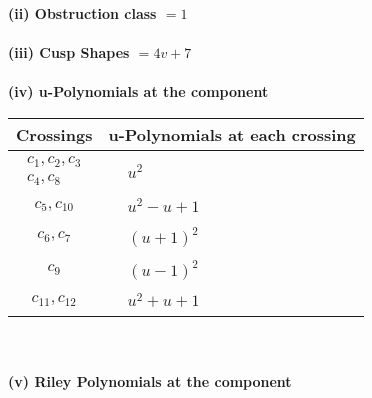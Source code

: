 \documentclass[1p]{elsarticle_modified}
\theoremstyle{definition}
\begin{document}
\flushleft \textbf{(ii) Obstruction class $= 1$}\\~\\
\flushleft \textbf{(iii) Cusp Shapes $= 4 v+7$}\\~\\
\newpage\renewcommand{\arraystretch}{1}
\flushleft \textbf{(iv) u-Polynomials at the component}\newline \\
\begin{tabular}{m{50pt}|m{274pt}}
Crossings & \hspace{64pt}u-Polynomials at each crossing \\
\hline $$\begin{aligned}c_{1},c_{2},c_{3}\\c_{4},c_{8}\end{aligned}$$&$\begin{aligned}
&u^2
\end{aligned}$\\
\hline $$\begin{aligned}c_{5},c_{10}\end{aligned}$$&$\begin{aligned}
&u^2- u+1
\end{aligned}$\\
\hline $$\begin{aligned}c_{6},c_{7}\end{aligned}$$&$\begin{aligned}
&(u+1)^2
\end{aligned}$\\
\hline $$\begin{aligned}c_{9}\end{aligned}$$&$\begin{aligned}
&(u-1)^2
\end{aligned}$\\
\hline $$\begin{aligned}c_{11},c_{12}\end{aligned}$$&$\begin{aligned}
&u^2+u+1
\end{aligned}$\\
\hline
\end{tabular}\\~\\
\newpage\renewcommand{\arraystretch}{1}
\flushleft \textbf{(v) Riley Polynomials at the component}\newline \\
\end{document}
